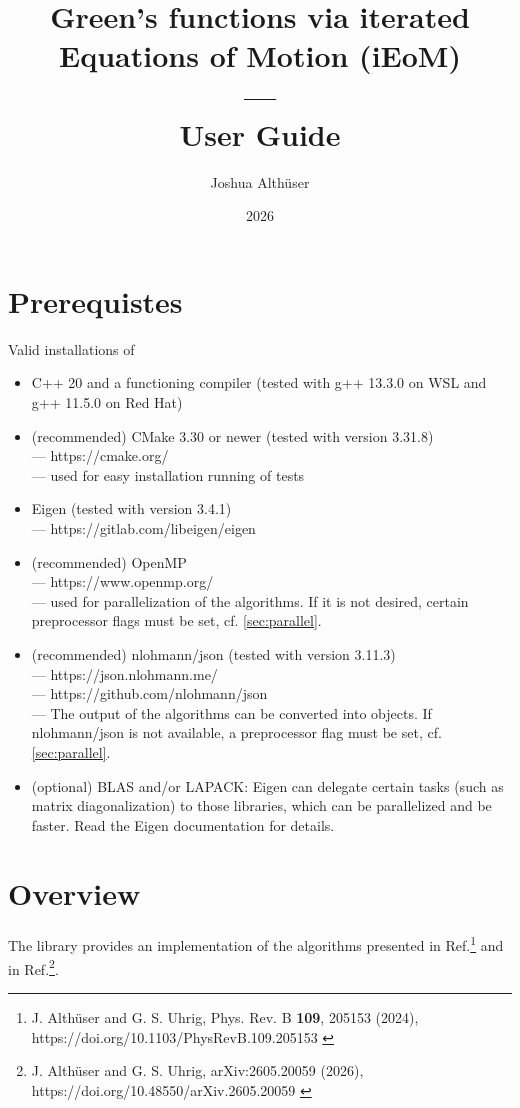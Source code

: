 \documentclass[11pt]{article}
\title{Green's functions via iterated Equations of Motion (iEoM) \\ --- \\ User Guide}
\author{Joshua Alth\"user}
\date{2026}
\newcommand{\code}[1]{%
  \texttt{\detokenize{#1}}%
}
\begin{document}
\maketitle

\section{Prerequistes}

Valid installations of
\begin{itemize}
  \item C++ 20 and a functioning compiler (tested with g++ 13.3.0 on WSL and g++ 11.5.0 on Red Hat)
  \item (recommended) CMake 3.30 or newer (tested with version 3.31.8) \\ --- https://cmake.org/ \\ --- used for easy installation running of tests
  \item Eigen (tested with version 3.4.1) \\ --- https://gitlab.com/libeigen/eigen
  \item (recommended) OpenMP \\ --- https://www.openmp.org/ \\ --- used for parallelization of the algorithms.
        If it is not desired, certain preprocessor flags must be set, cf. \cref{sec:parallel}.
  \item (recommended) nlohmann/json (tested with version 3.11.3) \\ --- https://json.nlohmann.me/  \\ --- https://github.com/nlohmann/json \\ --- The output of the algorithms can be converted into \code{nlohmann::json} objects.
  If nlohmann/json is not available, a preprocessor flag must be set, cf. \cref{sec:parallel}.
  \item (optional) BLAS and/or LAPACK: Eigen can delegate certain tasks (such as matrix diagonalization) to those libraries, which can be parallelized and be faster. Read the Eigen documentation for details.
\end{itemize}

\section{Overview}

The \code{iEoM} library provides an implementation of the algorithms presented in Ref.\footnote{J. Althüser and G. S. Uhrig, Phys. Rev. B \textbf{109}, 205153 (2024), https://doi.org/10.1103/PhysRevB.109.205153 \label{prb}} and in Ref.\footnote{J. Althüser and G. S. Uhrig, arXiv:2605.20059 (2026), https://doi.org/10.48550/arXiv.2605.20059 \label{arxiv}}.
\end{document}
